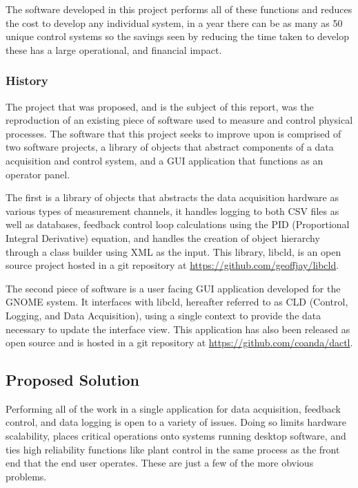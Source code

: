       The software developed in this project performs all of these functions
      and reduces the cost to develop any individual system, in a year there
      can be as many as 50 unique control systems so the savings seen by
      reducing the time taken to develop these has a large operational, and
      financial impact.

    \subsubsection{History}\label{sec:desc-bg-project}

      The project that was proposed, and is the subject of this report, was the
      reproduction of an existing piece of software used to measure and control
      physical processes. The software that this project seeks to improve upon
      is comprised of two software projects, a library of objects that abstract
      components of a data acquisition and control system, and a GUI application
      that functions as an operator panel.

      The first is a library of objects that abstracts the data acquisition
      hardware as various types of measurement channels, it handles logging
      to both CSV files as well as databases, feedback control loop
      calculations using the PID (Proportional Integral Derivative) equation,
      and handles the creation of object hierarchy through a class builder
      using XML as the input. This library, libcld, is an open source project
      hosted in a git repository at \url{https://github.com/geoffjay/libcld}.

      The second piece of software is a user facing GUI application developed for
      the GNOME system. It interfaces with libcld, hereafter referred to as
      CLD (Control, Logging, and Data Acquisition), using a single context to
      provide the data necessary to update the interface view. This application
      has also been released as open source and is hosted in a git repository
      at \url{https://github.com/coanda/dactl}.

  \subsection{Proposed Solution}\label{sec:desc-soln}

    Performing all of the work in a single application for data acquisition,
    feedback control, and data logging is open to a variety of issues. Doing so
    limits hardware scalability, places critical operations onto systems running
    desktop software, and ties high reliability functions like plant control in
    the same process as the front end that the end user operates. These are just
    a few of the more obvious problems.

